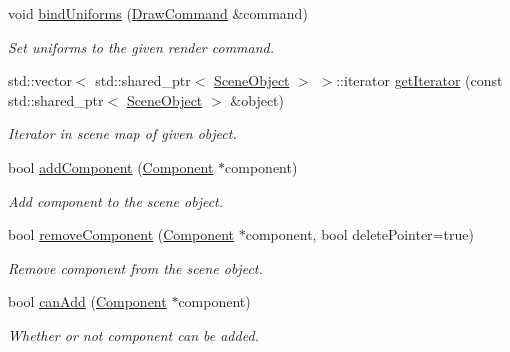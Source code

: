 \begin{Indent}
\begin{DoxyCompactItemize}
\mbox{\label{classrev_1_1_scene_a057b3f0ad447cbd1dbea3c7a048057cf}} 
void \mbox{\hyperlink{classrev_1_1_scene_a057b3f0ad447cbd1dbea3c7a048057cf}{bind\+Uniforms}} (\mbox{\hyperlink{classrev_1_1_draw_command}{Draw\+Command}} \&command)
\begin{DoxyCompactList}\small\item\em Set uniforms to the given render command. \end{DoxyCompactList}\item 
\mbox{\label{classrev_1_1_scene_a65dfa00e79a7eb6541c79553beae6a71}} 
std\+::vector$<$ std\+::shared\+\_\+ptr$<$ \mbox{\hyperlink{classrev_1_1_scene_object}{Scene\+Object}} $>$ $>$\+::iterator \mbox{\hyperlink{classrev_1_1_scene_a65dfa00e79a7eb6541c79553beae6a71}{get\+Iterator}} (const std\+::shared\+\_\+ptr$<$ \mbox{\hyperlink{classrev_1_1_scene_object}{Scene\+Object}} $>$ \&object)
\begin{DoxyCompactList}\small\item\em Iterator in scene map of given object. \end{DoxyCompactList}\item 
bool \mbox{\hyperlink{classrev_1_1_scene_a1d6dd18469c4b598dcc51f4a006f22ee}{add\+Component}} (\mbox{\hyperlink{classrev_1_1_component}{Component}} $\ast$component)
\begin{DoxyCompactList}\small\item\em Add component to the scene object. \end{DoxyCompactList}\item 
bool \mbox{\hyperlink{classrev_1_1_scene_a0ef96cdbc7ef9ed34ed8cf05aba6ff97}{remove\+Component}} (\mbox{\hyperlink{classrev_1_1_component}{Component}} $\ast$component, bool delete\+Pointer=true)
\begin{DoxyCompactList}\small\item\em Remove component from the scene object. \end{DoxyCompactList}\item 
\mbox{\label{classrev_1_1_scene_a0330f69d72467b466e1af6ad0385ec0c}} 
bool \mbox{\hyperlink{classrev_1_1_scene_a0330f69d72467b466e1af6ad0385ec0c}{can\+Add}} (\mbox{\hyperlink{classrev_1_1_component}{Component}} $\ast$component)
\begin{DoxyCompactList}\small\item\em Whether or not component can be added. \end{DoxyCompactList}\end{DoxyCompactItemize}
\end{Indent}
